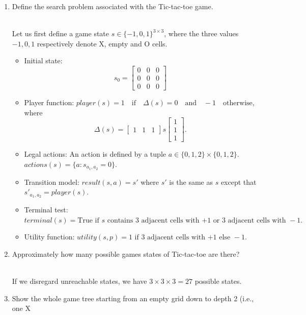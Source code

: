 \documentclass[9pt,a4paper]{extarticle}
\newenvironment{solution}
    {%
    \color{red}
    }
    { 
    \color{black}
    }
\begin{document}
\begin{enumerate}
    \item Define the search problem associated with the Tic-tac-toe game.
    \begin{solution}
    \\
    Let us first define a game state $s \in \{-1, 0, 1\}^{3\times 3}$, where the three values $-1, 0, 1$ respectively denote X, empty and O cells.
    \begin{itemize}
        \item Initial state: $$ s_0 = 
        \begin{bmatrix}
        0 & 0 & 0\\
        0 & 0 & 0\\
        0 & 0 & 0
        \end{bmatrix}
        $$
        \item Player function:
        $
        player(s) = 1 \quad \text{if} \quad \Delta(s) = 0 \quad \text{and} \quad -1 \quad \text{otherwise}
        $, where $$\Delta(s) = \begin{bmatrix}1 & 1 & 1\end{bmatrix}s\begin{bmatrix}1 \\ 1 \\ 1\end{bmatrix}. $$
        \item Legal actions: An action is defined by a tuple $a \in \{0, 1, 2\}\times \{0, 1, 2\}$.
        $actions(s) = \{a : s_{a_1, a_2} = 0\}$.
        \item Transition model:
        $ result(s, a) = s' $ where $s'$ is the same as $s$ except that $s'_{a_1, a_2} = player(s)$.
        \item Terminal test:
        $terminal(s) = \text{True if } s \text{ contains 3 adjacent cells with +1 or 3 adjacent cells with } -1.$
        \item Utility function: $utility(s, p) = 1 \text{ if 3 adjacent cells with +1 else } -1. $
    \end{itemize}
    \end{solution}
    \item Approximately how many possible games states of Tic-tac-toe are there?
    \begin{solution}
    \\
    If we disregard unreachable states, we have $3\times 3 \times 3 = 27$ possible states. 
    \end{solution}
    \item Show the whole game tree starting from an empty grid down to depth 2 (i.e., one X

\end{enumerate}
\end{document}
